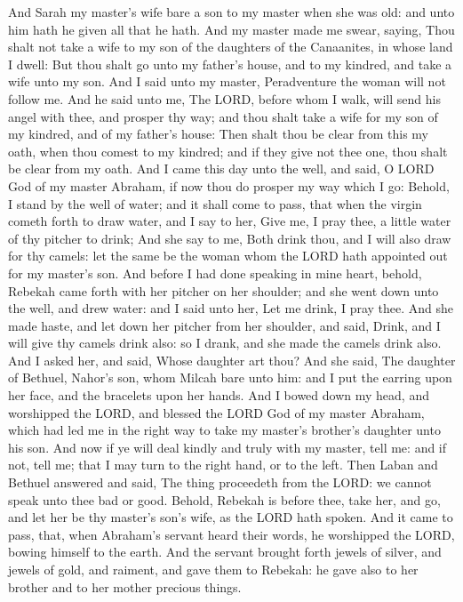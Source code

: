 \begin{biblechapter}
\verse And Sarah my master's wife bare a son to my master when she was old: and unto him hath he given all that he hath.
\verse And my master made me swear, saying, Thou shalt not take a wife to my son of the daughters of the Canaanites, in whose land I dwell:
\verse But thou shalt go unto my father's house, and to my kindred, and take a wife unto my son.
\verse And I said unto my master, Peradventure the woman will not follow me.
\verse And he said unto me, The LORD, before whom I walk, will send his angel with thee, and prosper thy way; and thou shalt take a wife for my son of my kindred, and of my father's house:
\verse Then shalt thou be clear from this my oath, when thou comest to my kindred; and if they give not thee one, thou shalt be clear from my oath.
\verse And I came this day unto the well, and said, O LORD God of my master Abraham, if now thou do prosper my way which I go:
\verse Behold, I stand by the well of water; and it shall come to pass, that when the virgin cometh forth to draw water, and I say to her, Give me, I pray thee, a little water of thy pitcher to drink;
\verse And she say to me, Both drink thou, and I will also draw for thy camels: let the same be the woman whom the LORD hath appointed out for my master's son.
\verse And before I had done speaking in mine heart, behold, Rebekah came forth with her pitcher on her shoulder; and she went down unto the well, and drew water: and I said unto her, Let me drink, I pray thee.
\verse And she made haste, and let down her pitcher from her shoulder, and said, Drink, and I will give thy camels drink also: so I drank, and she made the camels drink also.
\verse And I asked her, and said, Whose daughter art thou? And she said, The daughter of Bethuel, Nahor's son, whom Milcah bare unto him: and I put the earring upon her face, and the bracelets upon her hands.
\verse And I bowed down my head, and worshipped the LORD, and blessed the LORD God of my master Abraham, which had led me in the right way to take my master's brother's daughter unto his son.
\verse And now if ye will deal kindly and truly with my master, tell me: and if not, tell me; that I may turn to the right hand, or to the left.
\verse Then Laban and Bethuel answered and said, The thing proceedeth from the LORD: we cannot speak unto thee bad or good.
\verse Behold, Rebekah is before thee, take her, and go, and let her be thy master's son's wife, as the LORD hath spoken.
\verse And it came to pass, that, when Abraham's servant heard their words, he worshipped the LORD, bowing himself to the earth.
\verse And the servant brought forth jewels of silver, and jewels of gold, and raiment, and gave them to Rebekah: he gave also to her brother and to her mother precious things.

\end{biblechapter}
